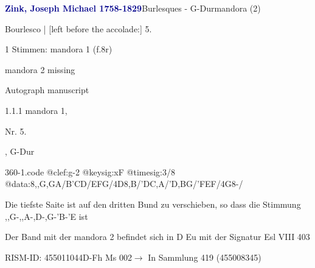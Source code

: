 \documentclass[twocolumn]{book}
\begin{document}
\par \vspace{7pt} \textcolor{darkblue}{\textbf{Zink, Joseph Michael  1758-1829}}\hfillplus{\textbf{[360]}}\newline Burlesques - G-Dur\newline mandora (2)
\par \begin{itshape}[f.8r, at left:] Bourlesco | [left before the accolade:] 5.\end{itshape} 
\par \textcolor{darkblue}{}  1 Stimmen: mandora 1  (f.8r)\newline \begin{small} mandora 2 missing\end{small} \newline Autograph manuscript
\par 1.1.1  mandora 1, \begin{itshape}Nr. 5.\end{itshape}, G-Dur  
\begin{filecontents*}{360-1.code}
@clef:g-2
@keysig:xF
@timesig:3/8
@data:8,,G,GA/B'CD/EFG/4D8,B/'DC,A/'D,BG/'FEF/4G8-/
\end{filecontents*}
\newline
%
\par Die tiefste Saite ist auf den dritten Bund zu verschieben, so dass die Stimmung ,,G-,,A-,D-,G-'B-'E ist
\par Der Band mit der mandora 2 befindet sich in D Eu mit der Signatur Esl VIII 403
\par RISM-ID: 455011044\newline D-Fh  Ms 002\newline $\rightarrow$ In Sammlung 419 (455008345)
      
\end{document}

